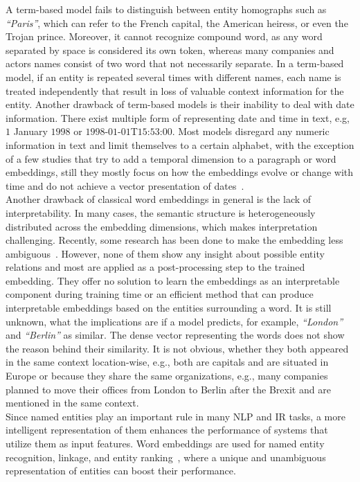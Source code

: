 A term-based model fails to distinguish between entity homographs such as  \emph{``Paris''},  which can refer to the French capital, the American heiress, or even the Trojan prince. Moreover, it cannot recognize compound word, as any word separated by space is considered its own token, whereas many companies and actors names consist of two word that not necessarily separate.  In a term-based model, if an entity is repeated several times with different names, each name is treated independently that result in loss of valuable context information for the entity. Another drawback of term-based models is their inability to deal with date information. There exist multiple form of representing date and time in text, e.g, $1$ January $1998$ or $1998$-$01$-$01$T$15$:$53$:$00$. Most models disregard any numeric information in text and limit themselves to a certain alphabet, with the exception of a few studies that try to add a temporal dimension to a paragraph or word embeddings, still they mostly focus on how the embeddings evolve or change with time and do not achieve a vector presentation of dates~.  \\
Another drawback of classical word embeddings in general is the lack of interpretability. In many cases, the semantic structure is heterogeneously distributed across the embedding dimensions, which makes interpretation challenging. Recently, some research has been done to make the embedding less ambiguous~. However, none of them show any insight about possible entity relations and most are applied as a post-processing step to the trained embedding. They offer no solution to learn the embeddings as an interpretable component during training time or an efficient method that can produce interpretable embeddings based on the entities surrounding a word. It is still unknown, what the implications are if a model predicts, for example,  \emph{``London''} and \emph{``Berlin''} as similar. The dense vector representing the words does not show the reason behind their similarity. It is not obvious, whether they both appeared in the same context location-wise, e.g., both are capitals and are situated in Europe or because they share the same organizations, e.g., many companies planned to move their offices from London to Berlin after the Brexit and are mentioned in the same context. \\
Since named entities play an important rule in many NLP and IR tasks, a more intelligent representation of them enhances the performance of systems that utilize them as input features. Word embeddings are used for named entity recognition, linkage, and entity ranking~, where a unique and unambiguous representation of entities can boost their performance.
